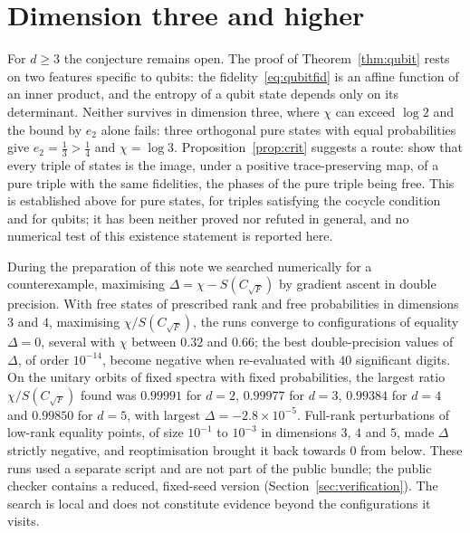 \documentclass[11pt,a4paper]{article}
\theoremstyle{definition}
\theoremstyle{plain}
\newcommand{\CF}{C_{\sqrt F}}
\begin{document}
\section{Dimension three and higher}
For $d\ge3$ the conjecture remains open. The proof of
Theorem~\ref{thm:qubit} rests on two features specific to qubits: the
fidelity~\eqref{eq:qubitfid} is an affine function of an inner product, and the
entropy of a qubit state depends only on its determinant. Neither survives in
dimension three, where $\chi$ can exceed $\log2$ and the bound by $e_2$ alone
fails: three orthogonal pure states with equal probabilities give
$e_2=\tfrac13>\tfrac14$ and $\chi=\log3$. Proposition~\ref{prop:crit} suggests a
route: show that every triple of states is the image, under a positive
trace-preserving map, of a pure triple with the same fidelities, the phases of
the pure triple being free. This is established above for pure states, for
triples satisfying the cocycle condition and for qubits; it has been neither
proved nor refuted in general, and no numerical test of this existence
statement is reported here.

During the preparation of this note we searched numerically for a
counterexample, maximising $\Delta=\chi-S(\CF)$ by gradient ascent in double
precision. With free states of prescribed rank and free probabilities in
dimensions $3$ and $4$, maximising $\chi/S(\CF)$, the runs converge to
configurations of equality $\Delta=0$, several with $\chi$ between $0.32$ and
$0.66$; the best double-precision values of $\Delta$, of order $10^{-14}$,
become negative when re-evaluated with $40$ significant digits. On the unitary
orbits of fixed spectra with fixed probabilities, the largest ratio
$\chi/S(\CF)$ found was $0.99991$ for $d=2$, $0.99977$ for $d=3$, $0.99384$ for
$d=4$ and $0.99850$ for $d=5$, with largest $\Delta=-2.8\times10^{-5}$.
Full-rank perturbations of low-rank equality points, of size $10^{-1}$ to
$10^{-3}$ in dimensions $3$, $4$ and $5$, made $\Delta$ strictly negative, and
reoptimisation brought it back towards $0$ from below. These runs used a
separate script and are not part of the public bundle; the public checker
contains a reduced, fixed-seed version (Section~\ref{sec:verification}). The
search is local and does not constitute evidence beyond the configurations it
visits.
\end{document}
